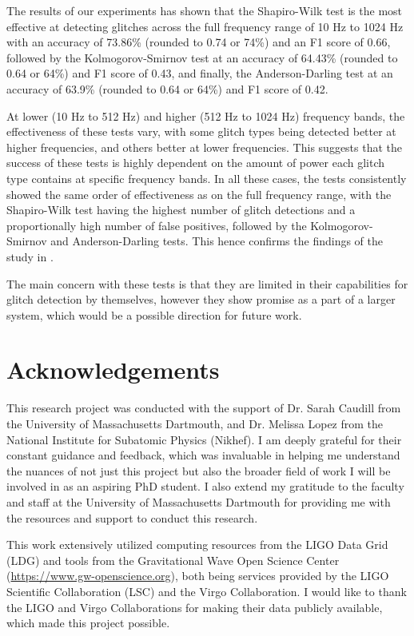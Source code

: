 \documentclass[12pt]{article}
\begin{document}
\medskip
\noindent The results of our experiments has shown that the Shapiro-Wilk test is the most effective at detecting glitches across the full frequency range of 10 Hz to 1024 Hz with an accuracy of 73.86\% (rounded to 0.74 or 74\%) and an F1 score of 0.66, followed by the Kolmogorov-Smirnov test at an accuracy of 64.43\% (rounded to 0.64 or 64\%) and F1 score of 0.43, and finally, the Anderson-Darling test at an accuracy of 63.9\% (rounded to 0.64 or 64\%) and F1 score of 0.42.

\medskip
\noindent At lower (10 Hz to 512 Hz) and higher (512 Hz to 1024 Hz) frequency bands, the effectiveness of these tests vary, with some glitch types being detected better at higher frequencies, and others better at lower frequencies. This suggests that the success of these tests is highly dependent on the amount of power each glitch type contains at specific frequency bands. In all these cases, the tests consistently showed the same order of effectiveness as on the full frequency range, with the Shapiro-Wilk test having the highest number of glitch detections and a proportionally high number of false positives, followed by the Kolmogorov-Smirnov and Anderson-Darling tests. This hence confirms the findings of the study in \cite{razali2011power}.

\medskip
\noindent The main concern with these tests is that they are limited in their capabilities for glitch detection by themselves, however they show promise as a part of a larger system, which would be a possible direction for future work.

\section{Acknowledgements}\label{Acknowledgements}

\noindent This research project was conducted with the support of Dr. Sarah Caudill from the University of Massachusetts Dartmouth, and Dr. Melissa Lopez from the National Institute for Subatomic Physics (Nikhef). I am deeply grateful for their constant guidance and feedback, which was invaluable in helping me understand the nuances of not just this project but also the broader field of work I will be involved in as an aspiring PhD student. I also extend my gratitude to the faculty and staff at the University of Massachusetts Dartmouth for providing me with the resources and support to conduct this research.

\medskip
\noindent This work extensively utilized computing resources from the LIGO Data Grid (LDG) and tools from the Gravitational Wave Open Science Center (\href{https://www.gw-openscience.org}{https://www.gw-openscience.org}), both being services provided by the LIGO Scientific Collaboration (LSC) and the Virgo Collaboration. I would like to thank the LIGO and Virgo Collaborations for making their data publicly available, which made this project possible.
\end{document}
